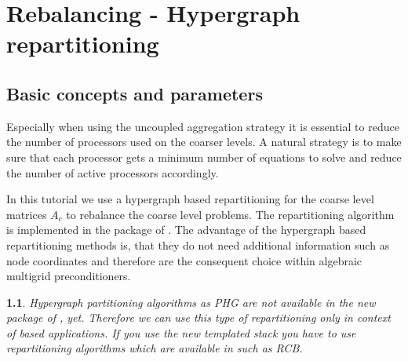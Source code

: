 \documentclass[10pt,fleqn]{book}
\newtheorem*{mycomment}{\ding{42}}
\newcommand\printScreenOutput[1]{

{\vspace{-0.3cm}\hfill\tiny{created with \muelu version }}
}
\begin{document}

\chapter{Rebalancing - Hypergraph repartitioning}

\section{Basic concepts and parameters}
Especially when using the uncoupled aggregation strategy it is essential to reduce the number of processors used on the coarser levels. A natural strategy is to make sure that each processor gets a minimum number of equations to solve and reduce the number of active processors accordingly.

In this tutorial we use a hypergraph based repartitioning for the coarse level matrices $A_c$ to rebalance the coarse level problems. The repartitioning algorithm is implemented in the \zoltan package of \trilinos. The advantage of the hypergraph based repartitioning methods is, that they do not need additional information such as node coordinates and therefore are the consequent choice within algebraic multigrid preconditioners.

\begin{mycomment}
Hypergraph partitioning algorithms as PHG are not available in the new \zoltantwo package of \trilinos, yet. Therefore we can use this type of repartitioning only in context of \epetra based applications. If you use the new templated \tpetra stack you have to use repartitioning algorithms which are available in \zoltantwo such as RCB.
\end{mycomment}
\end{document}
